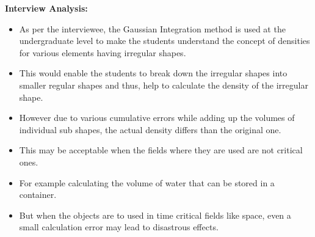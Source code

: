 \documentclass{article}
\begin{document}
\textbf{Interview Analysis: }
\begin{itemize}
    \item As per the interviewee, the Gaussian Integration method is used at the undergraduate level to make the students understand the concept of densities for various elements having irregular shapes.
    \item This would enable the students to break down the irregular shapes into smaller regular shapes and thus, help to calculate the density of the irregular shape. 
    \item However due to various cumulative errors while adding up the volumes of individual sub shapes, the actual density differs than the original one. 
    \item This may be acceptable when the fields where they are used are not critical ones. 
    \item For example calculating the volume of water that can be stored in a container. 
    \item But when the objects are to used in time critical fields like space, even a small calculation error may lead to disastrous effects.
\end{itemize}
\end{document}
